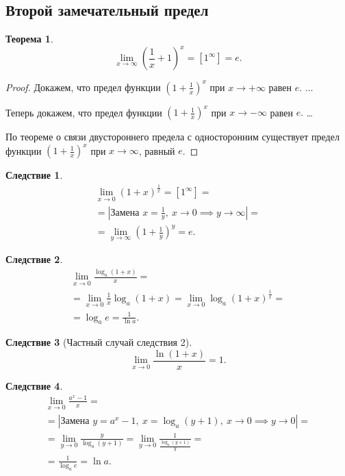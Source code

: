 \documentclass[a4paper,12pt]{article} %
\newtheorem{theorem}{Теорема}[section]
\newtheorem{corollary}{Следствие}[theorem]
\theoremstyle{remark}
\theoremstyle{definition}
\begin{document}
\subsection{Второй замечательный предел}
\begin{theorem}
	\[
		\lim_{x \to \infty} \left(\frac{1}{x} + 1 \right)^{x} = [1^{\infty}] = e
	.\] 
\end{theorem}
\begin{proof}
Докажем, что предел функции $(1+\frac{1}{x})^{x}$ при $x\to +\infty$ равен $e.$ 
$\ldots$

Теперь докажем, что предел функции $(1+\frac{1}{x})^{x}$ при $x\to -\infty$ равен $e.$ 
\ldots

По теореме о связи двустороннего предела с односторонним существует предел функции $(1 + \frac{1}{x})^{x}$ при $x\to \infty$, равный $e$.
\end{proof}
\begin{corollary}
	\begin{multline}
	\lim_{x \to 0} (1+x)^{\frac{1}{x}} = [1^{\infty}] = \\
	= |\text{Замена } x = \frac{1}{y}, \ x\to 0 \implies y\to \infty| = \\
	= \lim_{y \to \infty} \left(1+\frac{1}{y}\right)^{y} = e.
	\end{multline}
\end{corollary}
\begin{corollary}
\begin{multline}
	\lim_{x \to 0} \frac{\log_a(1+x)}{x} = \\
	= \lim_{x \to 0} \frac{1}{x} \log_a(1+x) = \lim_{x \to 0} \log_a(1+x)^{\frac{1}{x}} = \\
	= \log_a e = \frac{1}{\ln a}.
\end{multline}	
\end{corollary}
\begin{corollary}[Частный случай следствия 2]
	\[
	\lim_{x \to 0} \frac{\ln(1+x)}{x} = 1
	.\] 
\end{corollary}
\begin{corollary}
	\begin{multline}
		\lim_{x \to 0} \frac{a^{x}-1}{x} = \\
		= |\text{Замена } y = a^{x} - 1, \ x = \log_a(y+1), \ x\to 0 \implies y\to 0| = \\
		= \lim_{y \to 0} \frac{y}{\log_a(y+1)} = \lim_{y \to 0} \frac{1}{\frac{\log_a(y+1)}{y}} = \\
		= \frac{1}{\log_a e} = \ln a.
	\end{multline}
\end{corollary}
\end{document}
